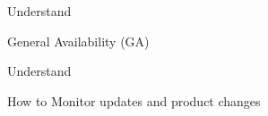\documentclass{scrartcl}
\newenvironment{flashcard}[2][]{%
    #1
    \vfill
    \centerline{\Large{#2}}
    \vfill
    \newpage
}
{\newpage}
\begin{document}
    \begin{flashcard}[Understand]{General Availability (GA)}

    \end{flashcard}

    \begin{flashcard}[Understand]{How to Monitor updates and product changes}

    \end{flashcard}

    \doclicenseThis
    \pagebreak
\end{document}
